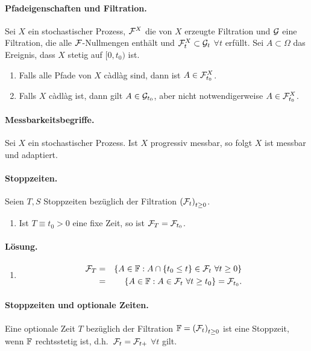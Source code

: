 \paragraph{Pfadeigenschaften und Filtration. }  Sei $X$ ein stochastischer
Prozess, $\mathcal F^{X}$ die von $X$ erzeugte Filtration und $\mathcal G$ eine Filtration,
die alle $\mathcal F$-Nullmengen enthält und $\mathcal F^{X}_t \subset \mathcal G_t$ $\forall t$
erfüllt.  Sei $A \subset \Omega$ das Ereignis, dass $X$ stetig auf $[0, t_0)$
ist. 
\begin{enumerate}
    \item Falls alle Pfade von $X$ c\`adl\`ag sind, dann ist $A \in \mathcal F^{X}_{t_0}$.
    \item Falls $X$ c\`adl\`ag ist, dann gilt $A \in \mathcal G_{t_0}$, aber nicht
        notwendigerweise $A \in \mathcal F^{X}_{t_0}$.
\end{enumerate}

\paragraph{Messbarkeitsbegriffe. } Sei $X$ ein stochastischer Prozess. Ist $X$
progressiv messbar, so folgt $X$ ist messbar und adaptiert.


\paragraph{Stoppzeiten. } Seien $T,S$ Stoppzeiten bezüglich der Filtration
$\left( \mathcal F_t \right)_{t \geq 0}$. 
\begin{enumerate}
    \item Ist $T \equiv t_0>0$ eine fixe Zeit, so ist $\mathcal F_T=\mathcal F_{t_0}$.
\end{enumerate}

\paragraph*{Lösung. }
\begin{enumerate}
    \item \begin{eqnarray}
            \mathcal F_T &=& 
            \left\{ A\in\mathbb F : A \cap \left\{ t_0 \leq t \right\}\in\mathcal F_t \ \forall t\geq 0 \right\} \\
            &=& \left\{ A\in\mathbb F : A\in\mathcal F_t \ \forall t\geq t_0 \right\} = \mathcal F_{t_0}.
        \end{eqnarray}
\end{enumerate}


\paragraph{Stoppzeiten und optionale Zeiten. } Eine optionale Zeit $T$ bezüglich
der Filtration $\mathbb F=\left( \mathcal F_t \right)_{t \geq 0}$ ist eine Stoppzeit, wenn 
$\mathbb F$ rechtsstetig ist, d.h.\ $\mathcal F_t=\mathcal F_{t+}$ $\forall t$ gilt.

